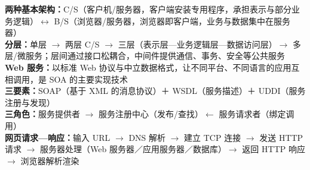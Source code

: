 \documentclass[a4paper,11pt]{article}
\begin{document}

\begin{knowmap}
\textbf{两种基本架构：}C/S（客户机/服务器，客户端安装专用程序，承担表示与部分业务逻辑）$\leftrightarrow$ B/S（浏览器/服务器，浏览器即客户端，业务与数据集中在服务器）\\[2pt]
\textbf{分层：}单层 $\rightarrow$ 两层 C/S $\rightarrow$ 三层（表示层—业务逻辑层—数据访问层）$\rightarrow$ 多层/微服务；层间通过接口松耦合，中间件提供通信、事务、安全等公共服务\\[2pt]
\textbf{Web 服务：}以标准 Web 协议与中立数据格式，让不同平台、不同语言的应用互相调用，是 SOA 的主要实现技术\\[2pt]
\textbf{三要素：}SOAP（基于 XML 的消息协议）＋ WSDL（服务描述）＋ UDDI（服务注册与发现）\\[2pt]
\textbf{三角色：}服务提供者 $\rightarrow$ 服务注册中心（发布/查找）$\leftarrow$ 服务请求者（绑定调用）\\[2pt]
\textbf{网页请求—响应：}输入 URL $\rightarrow$ DNS 解析 $\rightarrow$ 建立 TCP 连接 $\rightarrow$ 发送 HTTP 请求 $\rightarrow$ 服务器处理（Web 服务器／应用服务器／数据库）$\rightarrow$ 返回 HTTP 响应 $\rightarrow$ 浏览器解析渲染
\end{knowmap}
\end{document}
